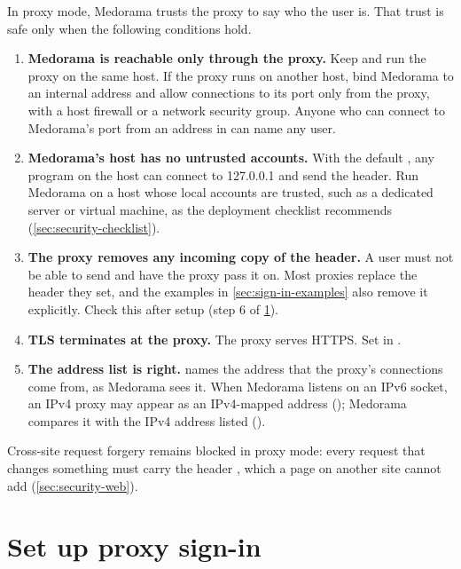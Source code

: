 In proxy mode, Medorama trusts the proxy to say who the user is. That trust is safe only when
the following conditions hold.
\begin{enumerate}
\item \textbf{Medorama is reachable only through the proxy.} Keep  and
  run the proxy on the same host. If the proxy runs on another host, bind Medorama to an
  internal address and allow connections to its port only from the proxy, with a host firewall
  or a network security group. Anyone who can connect to Medorama's port from an address in
   can name any user.
\item \textbf{Medorama's host has no untrusted accounts.} With the default
  , any program on the host can connect to 127.0.0.1 and send the header.
  Run Medorama on a host whose local accounts are trusted, such as a dedicated server or virtual
  machine, as the deployment checklist recommends (\cref{sec:security-checklist}).
\item \textbf{The proxy removes any incoming copy of the header.} A user must not be able to
  send  and have the proxy pass it on. Most proxies replace the header they
  set, and the examples in \cref{sec:sign-in-examples} also remove it explicitly. Check this
  after setup (step 6 of \cref{sec:sign-in-setup}).
\item \textbf{TLS terminates at the proxy.} The proxy serves HTTPS. Set
   in .
\item \textbf{The address list is right.}  names the address that the
  proxy's connections come from, as Medorama sees it. When Medorama listens on an IPv6 socket, an
  IPv4 proxy may appear as an IPv4-mapped address (); Medorama compares it
  with the IPv4 address listed ().
\end{enumerate}

Cross-site request forgery remains blocked in proxy mode: every request that changes something
must carry the header , which a page on another site cannot add
(\cref{sec:security-web}).

\section{Set up proxy sign-in}
\label{sec:sign-in-setup}

